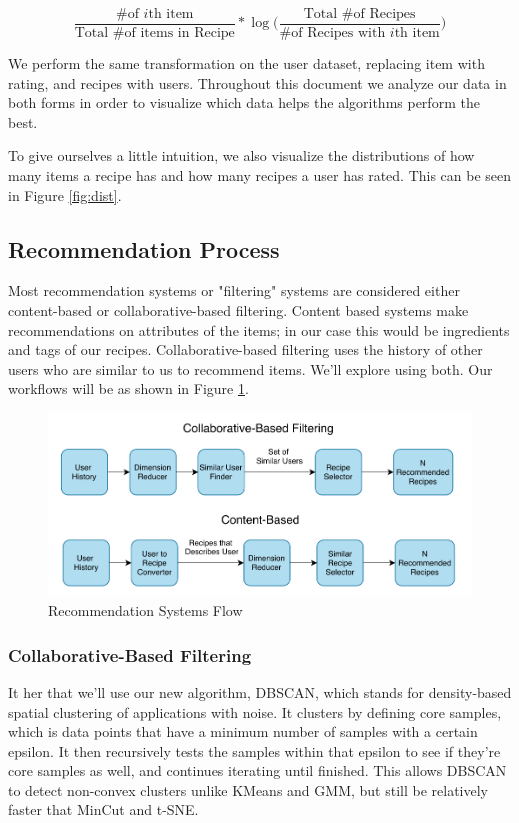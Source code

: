 \documentclass[11pt]{article}
\newcommand*\textfrac[2]{
  \frac{\text{#1}}{\text{#2}}
}
\begin{document}
$$\textfrac{\# of $i$th item}{Total \# of items in Recipe} * \log \Big( \textfrac{Total \# of Recipes}{\# of Recipes with $i$th item} \Big)$$

We perform the same transformation on the user dataset, replacing item with rating, and recipes with users. Throughout this document we analyze our data in both forms in order to visualize which data helps the algorithms perform the best.

To give ourselves a little intuition, we also visualize the distributions of how many items a recipe has and how many recipes a user has rated. This can be seen in Figure \ref{fig:dist}.


\subsection{Recommendation Process}
Most recommendation systems or "filtering" systems are considered either content-based or collaborative-based filtering. Content based systems make recommendations on attributes of the items; in our case this would be ingredients and tags of our recipes. Collaborative-based filtering uses the history of other users who are similar to us to recommend items. We'll explore using both. Our workflows will be as shown in Figure \ref{fig:flow}.

\begin{figure}[t]
\centering
\includegraphics[width=1\textwidth]{figs/flow.pdf}
\caption{Recommendation Systems Flow}
\label{fig:flow}
\end{figure}

\subsubsection{Collaborative-Based Filtering}

It her that we'll use our new algorithm, DBSCAN, which stands for density-based spatial clustering of applications with noise. It clusters by defining core samples, which is data points that have a minimum number of samples with a certain epsilon. It then recursively tests the samples within that epsilon to see if they're core samples as well, and continues iterating until finished. This allows DBSCAN to detect non-convex clusters unlike KMeans and GMM, but still be relatively faster that MinCut and t-SNE.
\end{document}
